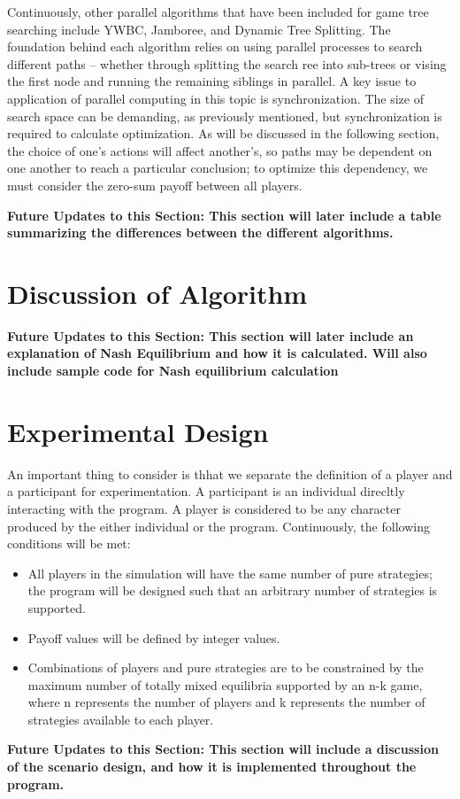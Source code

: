 \documentclass[conference]{IEEEtran}
\begin{document}
Continuously, other parallel algorithms that have been included for game tree searching include YWBC, Jamboree, and Dynamic Tree Splitting. The foundation behind each algorithm relies on using parallel processes to search different paths -- whether through splitting the search ree into sub-trees or vising the first node and running the remaining siblings in parallel. A key issue to application of parallel computing in this topic is synchronization. The size of search space can be demanding, as previously mentioned, but synchronization is required to calculate optimization. As will be discussed in the following section, the choice of one's actions will affect another's, so paths may be dependent on one another to reach a particular conclusion; to optimize this dependency, we must consider the zero-sum payoff between all players.
\medskip

\color{red} \noindent \textbf{Future Updates to this Section: This section will later include a table summarizing the differences between the different algorithms.}
\medskip

\color{black}
\section{Discussion of Algorithm}
\color{red} \noindent \textbf{Future Updates to this Section: This section will later include an explanation of Nash Equilibrium and how it is calculated. Will also include sample code for Nash equilibrium calculation}
\medskip

\color{black}
\section{Experimental Design}
An important thing to consider is thhat we separate the definition of a player and a participant for experimentation. A participant is an individual direcltly interacting with the program. A player is considered to be any character produced by the either individual or the program. Continuously, the following conditions will be met:

\begin{itemize}
	\item All players in the simulation will have the same number of pure strategies; the program will be designed such that an arbitrary number of strategies is supported.
	\item Payoff values will be defined by integer values.
	\item Combinations of players and pure strategies are to be constrained by the maximum number of totally mixed equilibria supported by an n-k game, where n represents the number of players and k represents the number of strategies available to each player.
\end{itemize}
\color{red} \noindent \textbf{Future Updates to this Section: This section will include a discussion of the scenario design, and how it is implemented throughout the program.}
\medskip
\end{document}
